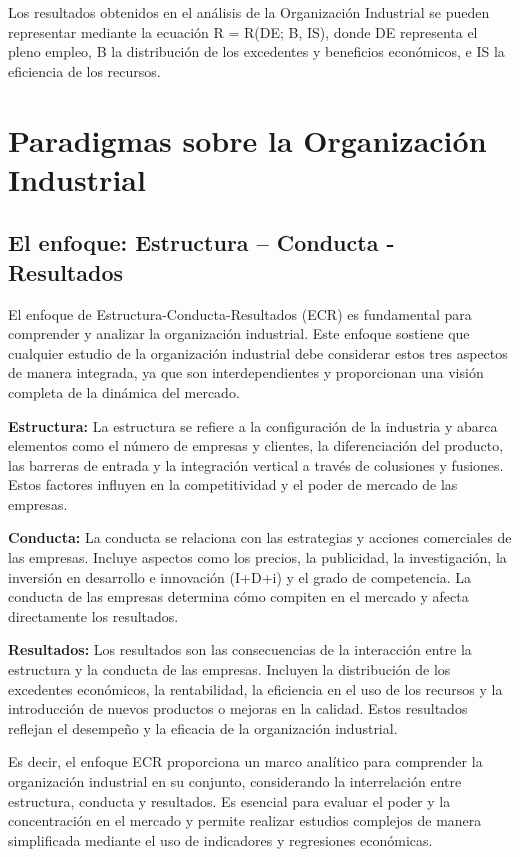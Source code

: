 \documentclass[
  doc,
  floatsintext,
  longtable,
  a4paper,
  nolmodern,
  notxfonts,
  notimes,
  12pt,
  colorlinks=true,linkcolor=blue,citecolor=blue,urlcolor=blue]{apa7}
\begin{document}
Los resultados obtenidos en el análisis de la Organización Industrial se
pueden representar mediante la ecuación R = R(DE; B, IS), donde DE
representa el pleno empleo, B la distribución de los excedentes y
beneficios económicos, e IS la eficiencia de los recursos.

\section{Paradigmas sobre la Organización
Industrial}\label{paradigmas-sobre-la-organizaciuxf3n-industrial}

\subsection{El enfoque: Estructura -- Conducta -
Resultados}\label{el-enfoque-estructura-conducta---resultados}

El enfoque de Estructura-Conducta-Resultados (ECR) es fundamental para
comprender y analizar la organización industrial. Este enfoque sostiene
que cualquier estudio de la organización industrial debe considerar
estos tres aspectos de manera integrada, ya que son interdependientes y
proporcionan una visión completa de la dinámica del mercado.

\textbf{Estructura:} La estructura se refiere a la configuración de la
industria y abarca elementos como el número de empresas y clientes, la
diferenciación del producto, las barreras de entrada y la integración
vertical a través de colusiones y fusiones. Estos factores influyen en
la competitividad y el poder de mercado de las empresas.

\textbf{Conducta:} La conducta se relaciona con las estrategias y
acciones comerciales de las empresas. Incluye aspectos como los precios,
la publicidad, la investigación, la inversión en desarrollo e innovación
(I+D+i) y el grado de competencia. La conducta de las empresas determina
cómo compiten en el mercado y afecta directamente los resultados.

\textbf{Resultados:} Los resultados son las consecuencias de la
interacción entre la estructura y la conducta de las empresas. Incluyen
la distribución de los excedentes económicos, la rentabilidad, la
eficiencia en el uso de los recursos y la introducción de nuevos
productos o mejoras en la calidad. Estos resultados reflejan el
desempeño y la eficacia de la organización industrial.

Es decir, el enfoque ECR proporciona un marco analítico para comprender
la organización industrial en su conjunto, considerando la interrelación
entre estructura, conducta y resultados. Es esencial para evaluar el
poder y la concentración en el mercado y permite realizar estudios
complejos de manera simplificada mediante el uso de indicadores y
regresiones económicas.
\end{document}
